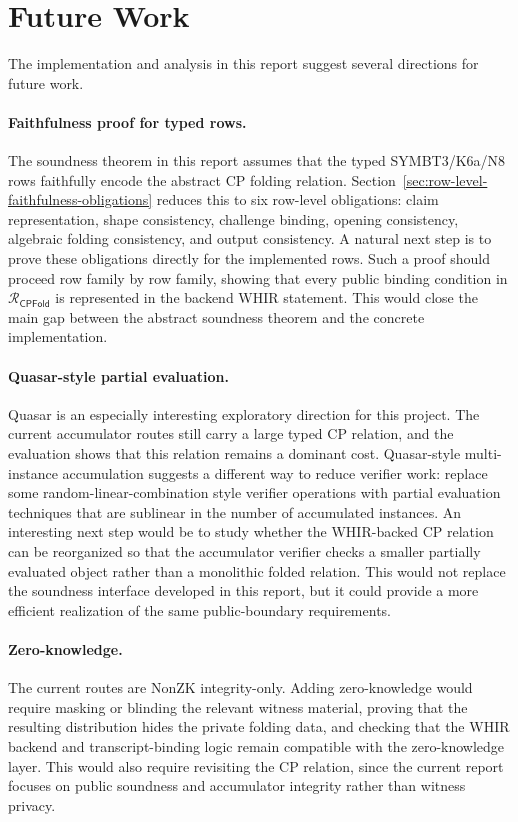 \documentclass[11pt]{article}
\theoremstyle{definition}
\newcommand{\Rcp}{\mathcal{R}_{\mathsf{CPFold}}}
\begin{document}
\section{Future Work}
\label{sec:future-work}

The implementation and analysis in this report suggest several directions for
future work.

\paragraph{Faithfulness proof for typed rows.}
The soundness theorem in this report assumes that the typed SYMBT3/K6a/N8 rows
faithfully encode the abstract CP folding relation. Section~\ref{sec:row-level-faithfulness-obligations}
reduces this to six row-level obligations: claim representation, shape
consistency, challenge binding, opening consistency, algebraic folding
consistency, and output consistency. A natural next step is to prove these
obligations directly for the implemented rows. Such a proof should proceed
row family by row family, showing that every public binding condition in
\(\Rcp\) is represented in the backend WHIR statement. This would close the
main gap between the abstract soundness theorem and the concrete implementation.

\paragraph{Quasar-style partial evaluation.}
Quasar is an especially interesting exploratory direction for this project.
The current accumulator routes still carry a large typed CP relation, and the
evaluation shows that this relation remains a dominant cost. Quasar-style
multi-instance accumulation suggests a different way to reduce verifier work:
replace some random-linear-combination style verifier operations with partial
evaluation techniques that are sublinear in the number of accumulated instances.
An interesting next step would be to study whether the WHIR-backed CP relation
can be reorganized so that the accumulator verifier checks a smaller partially
evaluated object rather than a monolithic folded relation. This would not replace
the soundness interface developed in this report, but it could provide a more
efficient realization of the same public-boundary requirements.

\paragraph{Zero-knowledge.}
The current routes are NonZK integrity-only. Adding zero-knowledge would require
masking or blinding the relevant witness material, proving that the resulting
distribution hides the private folding data, and checking that the WHIR backend
and transcript-binding logic remain compatible with the zero-knowledge layer.
This would also require revisiting the CP relation, since the current report
focuses on public soundness and accumulator integrity rather than witness
privacy.
\end{document}
